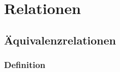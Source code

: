 \Tut\chapter{Relationen}
\label{u:relationen}

\Tut\section{\"Aquivalenzrelationen}
\label{sub:aequiv-rel}

\Tut\subsection{Definition}
\label{subsub:aequiv-def}

